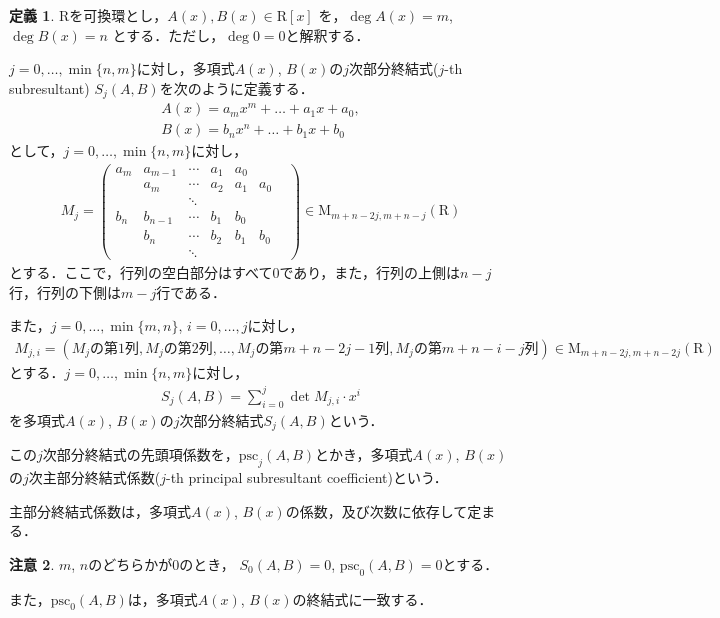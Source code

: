 \documentclass[uplatex, dvipdfmx]{jsarticle}
\numberwithin{equation}{section}
\newcommand{\psc}{\mathrm{psc}}
\theoremstyle{definition}
\newtheorem{definition}{定義}[section]
\newtheorem{remark}[definition]{注意}
\begin{document}
\begin{definition}
$\mathrm{R}$を可換環とし，$A(x), B(x) \in \mathrm{R}[x]$ を，$\deg A(x) = m$, $\deg B(x) = n$ とする．ただし，$\deg 0 = 0$と解釈する．

$j = 0, \dots, \min\{n, m\}$に対し，多項式$A(x)$, $B(x)$の$j$次部分終結式($j$-th subresultant) $S_j(A, B)$を次のように定義する．
\begin{align}
A(x) = a_m x^m + \dots + a_1 x + a_0, \\
B(x) = b_n x^n + \dots + b_1 x + b_0 
\end{align}
として，$j = 0, \dots, \min\{n,m\}$に対し，
\begin{align}
M_j = 
\begin{pmatrix}
a_m & a_{m-1} & \cdots & a_1 & a_0 &    &  \\
     &  a_m     & \cdots & a_2 & a_1& a_0 &  \\
     &   & \ddots &  & & \\
b_n & b_{n-1} & \cdots & b_1 & b_0 &    & \\
     &  b_n     & \cdots & b_2 & b_1& b_0 & \\
     &   & \ddots &  & & 
\end{pmatrix}
\in \mathrm{M}_{m+n-2j, m+n-j}(\mathrm{R})
\end{align}
とする．ここで，行列の空白部分はすべて$0$であり，また，行列の上側は$n-j$行，行列の下側は$m-j$行である．

また，$j = 0, \dots, \min\{m,n\}$, $i = 0, \dots, j$に対し，
\begin{align}
M_{j,i} = (\text{$M_j$の第$1$列}, \text{$M_j$の第$2$列}, \dots ,\text{$M_j$の第$m+n-2j-1$列}, \text{$M_j$の第$m+n-i-j$列})
\in \mathrm{M}_{m+n-2j, m+n-2j}(\mathrm{R})
\end{align}
とする．$j = 0, \dots, \min\{n, m\}$に対し，
\begin{align}
S_j(A, B) = \sum_{i=0}^j \det M_{j, i} \cdot x^i 
\end{align}
を多項式$A(x)$, $B(x)$の$j$次部分終結式$S_j(A, B)$という．

この$j$次部分終結式の先頭項係数を，$\psc_j(A,B)$とかき，多項式$A(x)$, $B(x)$の$j$次主部分終結式係数($j$-th principal subresultant coefficient)という．
\end{definition}


主部分終結式係数は，多項式$A(x)$, $B(x)$の係数，及び次数に依存して定まる．

\begin{remark}
$m$, $n$のどちらかが$0$のとき，
$S_0(A,B) = 0$, $\psc_0(A,B) = 0$とする．

また，$\psc_0(A,B)$は，多項式$A(x)$, $B(x)$の終結式に一致する．
\end{remark}
\end{document}
